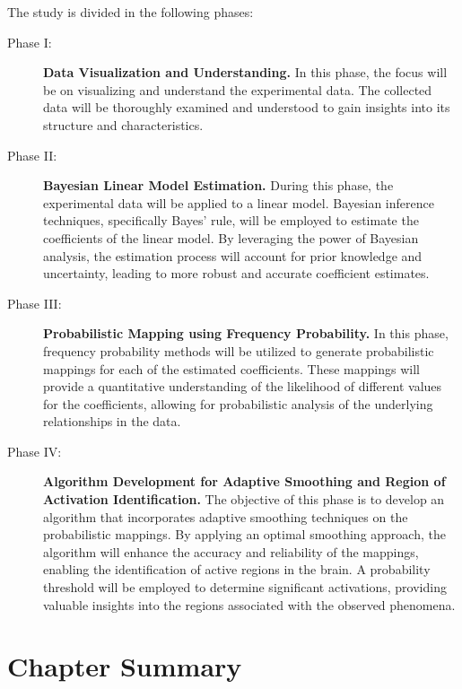 \noindent The study is divided in the following phases: 

\begin{description}
\item [Phase I:] \textbf{Data Visualization and Understanding.} In this phase, the focus will be on visualizing and understand the experimental data. The collected data will be thoroughly examined and understood to gain insights into its structure and characteristics.

\item [Phase II:] \textbf{Bayesian Linear Model Estimation.} During this phase, the experimental data will be applied to a linear model. Bayesian inference techniques, specifically Bayes' rule, will be employed to estimate the coefficients of the linear model. By leveraging the power of Bayesian analysis, the estimation process will account for prior knowledge and uncertainty, leading to more robust and accurate coefficient estimates.

\item [Phase III:] \textbf{Probabilistic Mapping using Frequency Probability.} In this phase, frequency probability methods will be utilized to generate probabilistic mappings for each of the estimated coefficients. These mappings will provide a quantitative understanding of the likelihood of different values for the coefficients, allowing for probabilistic analysis of the underlying relationships in the data.

\item [Phase IV:] \textbf{Algorithm Development for Adaptive Smoothing and Region of \linebreak Activation Identification.} The objective of this phase is to develop an algorithm that incorporates adaptive smoothing techniques on the probabilistic mappings. By applying an optimal smoothing approach, the algorithm will enhance the accuracy and reliability of the mappings, enabling the identification of active regions in the brain. A probability threshold will be employed to determine significant activations, providing valuable insights into the regions associated with the observed phenomena.

\end{description}

\section{Chapter Summary}

